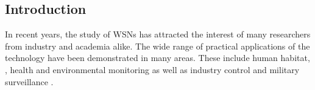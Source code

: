 \subsection{Introduction}

\begin{comment}
The study of Wireless Sensor Networks (WSNs) has increasingly attracted the interest of many researchers in recent years. Their wide range of possible applications have been demonstrated in many areas. These include human habitat, \cite{mainwaring2002wireless}, health \cite{virone2006advanced} and environmental monitoring \cite{4379685,cardell2004field} as well as industry control \cite{1631480} and military surveillance \cite{6268958}.  Advances in the ever-developing field of Micro-Electro-Mechanical Systems (MEMS) in parallel with the latest developments in software technologies have created additional
opportunities to integrate WSNs into our everyday life.  As the field of WSNs matures, ,draws growing attention from industry and academy alike.
%
The explosion of technological innovations in the past decades has irreversibly changed our way of life. Advances in the ever-developing field of Micro-Electro-Mechanical Systems (MEMS), in parallel with the latest developments in software technologies, have created new opportunities to assist our life. By adding computational intelligence to everyday objects they become smarter and more interactive. Together with other embedded devices, such as mobile phones and security cameras, Wireless Sensor Networks (WSNs) contributed to the creation of an additional sensing / actuating layer to our surroundings. This fusion of the various embedded devices into people's living environments is motivated by potential benefits such as simplified management and improved utilization of scarce resources.  

\end{comment}

In recent years, the study of WSNs has attracted the interest of many researchers from industry and academia alike.  The wide range of practical applications of the technology have been demonstrated in many areas. These include human habitat, \cite{mainwaring2002wireless}, health \cite{virone2006advanced} and environmental monitoring \cite{4379685,cardell2004field} as well as industry control \cite{1631480} and military surveillance \cite{6268958}. 


